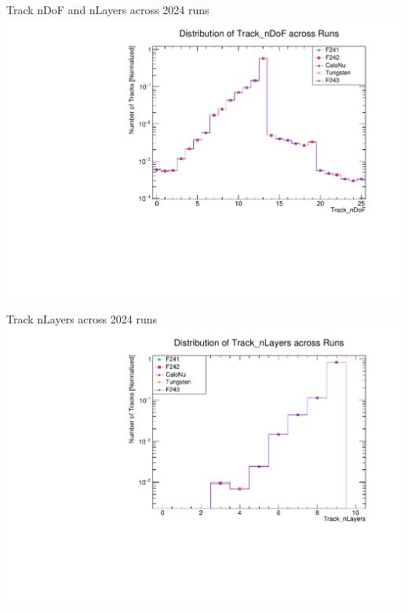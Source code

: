 \begin{frame}{Track nDoF and nLayers across 2024 runs}
	\includegraphics[width=\linewidth]{./RunwisePlots/Track_nDoF_runwise.pdf}
\end{frame}


\begin{frame}{Track nLayers across 2024 runs}
	\includegraphics[width=\linewidth]{./RunwisePlots/Track_nLayers_runwise.pdf}
\end{frame}

